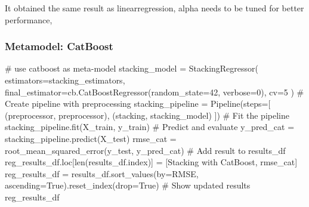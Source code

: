 \documentclass[
  letterpaper,
  DIV=11,
  numbers=noendperiod]{scrreprt}
\newenvironment{Shaded}{\begin{snugshade}}{\end{snugshade}}
\newcommand{\BuiltInTok}[1]{\textcolor[rgb]{0.00,0.23,0.31}{#1}}
\newcommand{\CommentTok}[1]{\textcolor[rgb]{0.37,0.37,0.37}{#1}}
\newcommand{\DecValTok}[1]{\textcolor[rgb]{0.68,0.00,0.00}{#1}}
\newcommand{\NormalTok}[1]{\textcolor[rgb]{0.00,0.23,0.31}{#1}}
\newcommand{\OperatorTok}[1]{\textcolor[rgb]{0.37,0.37,0.37}{#1}}
\newcommand{\StringTok}[1]{\textcolor[rgb]{0.13,0.47,0.30}{#1}}
\newcommand{\VariableTok}[1]{\textcolor[rgb]{0.07,0.07,0.07}{#1}}
\begin{document}
It obtained the same result as linearregression, alpha needs to be tuned
for better performance,

\subsubsection{Metamodel: CatBoost}\label{metamodel-catboost}

\begin{Shaded}
\begin{Highlighting}[]
\CommentTok{\# use catboost as meta{-}model}
\NormalTok{stacking\_model }\OperatorTok{=}\NormalTok{ StackingRegressor(}
\NormalTok{    estimators}\OperatorTok{=}\NormalTok{stacking\_estimators,}
\NormalTok{    final\_estimator}\OperatorTok{=}\NormalTok{cb.CatBoostRegressor(random\_state}\OperatorTok{=}\DecValTok{42}\NormalTok{, verbose}\OperatorTok{=}\DecValTok{0}\NormalTok{),}
\NormalTok{    cv}\OperatorTok{=}\DecValTok{5}
\NormalTok{)}
\CommentTok{\# Create pipeline with preprocessing}
\NormalTok{stacking\_pipeline }\OperatorTok{=}\NormalTok{ Pipeline(steps}\OperatorTok{=}\NormalTok{[}
\NormalTok{    (}\StringTok{\textquotesingle{}preprocessor\textquotesingle{}}\NormalTok{, preprocessor),}
\NormalTok{    (}\StringTok{\textquotesingle{}stacking\textquotesingle{}}\NormalTok{, stacking\_model)}
\NormalTok{])}
\CommentTok{\# Fit the pipeline}
\NormalTok{stacking\_pipeline.fit(X\_train, y\_train)}
\CommentTok{\# Predict and evaluate}
\NormalTok{y\_pred\_cat }\OperatorTok{=}\NormalTok{ stacking\_pipeline.predict(X\_test)}
\NormalTok{rmse\_cat }\OperatorTok{=}\NormalTok{ root\_mean\_squared\_error(y\_test, y\_pred\_cat)}
\CommentTok{\# Add result to results\_df}
\NormalTok{reg\_results\_df.loc[}\BuiltInTok{len}\NormalTok{(results\_df.index)] }\OperatorTok{=}\NormalTok{ [}\StringTok{\textquotesingle{}Stacking with CatBoost\textquotesingle{}}\NormalTok{, rmse\_cat]}
\NormalTok{reg\_results\_df }\OperatorTok{=}\NormalTok{ results\_df.sort\_values(by}\OperatorTok{=}\StringTok{\textquotesingle{}RMSE\textquotesingle{}}\NormalTok{, ascending}\OperatorTok{=}\VariableTok{True}\NormalTok{).reset\_index(drop}\OperatorTok{=}\VariableTok{True}\NormalTok{)}
\CommentTok{\# Show updated results}
\NormalTok{reg\_results\_df}
\end{Highlighting}
\end{Shaded}
\end{document}
